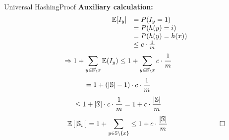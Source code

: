 
\begin{frame}{Universal Hashing}{Proof}
  \textbf{Auxiliary calculation:}
   {\color{MainA}
     \vspace*{-2em}
     \begin{align*}
       \hspace{6em}           
       \begin{array}{rl}
         \mathbb{E}[I_y] & = P(I_y = 1)\\
         {} & = P(h(y) = i)\\
         {} & = P(h(y) = h(x))\\
         {} & \leq c \cdot \frac{1}{m}
       \end{array}
   \end{align*}}
   {\color{MainA}
     \vspace{-0.6em}
     \begin{displaymath}
       \hspace*{-3em}
       \Rightarrow 1 + \sum_{y \in \mathbb{S} \setminus x} \E(I_y)
       \leq 1 + \sum_{y \in \mathbb{S} \setminus x} c \cdot \frac{1}{m}
     \end{displaymath}
     \vspace{-0.6em}
     \begin{displaymath}
       \hspace*{-3em}
       = 1 + \left(\vert \mathbb{S}  \vert - 1\right) \cdot c \cdot \frac{1}{m}
     \end{displaymath}
     \vspace{-0.6em}
     \begin{displaymath}
       \hspace*{-3em}
       \displaystyle \leq 1 + \vert \mathbb{S} \vert \cdot c \cdot \frac{1}{m}
       = 1 + c \cdot \frac{\vert \mathbb{S} \vert}{m}
     \end{displaymath}
     \vspace{-0.6em}
     \begin{displaymath}
       \hspace*{5em}
       \mathbb{E}\left[\vert \mathbb{S}_i \vert\right]
       = 1 + \sum_{y \in \mathbb{S} \setminus \{x\}}
       \leq 1 + c \cdot \frac{\vert \mathbb{S} \vert}{m}
       \hspace*{7.5em}\square
   \end{displaymath}}
\end{frame}
